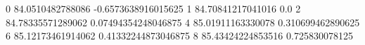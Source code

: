 0 84.0510482788086 -0.6573638916015625
1 84.70841217041016 0.0
2 84.78335571289062 0.07494354248046875
4 85.01911163330078 0.310699462890625
6 85.12173461914062 0.41332244873046875
8 85.43424224853516 0.725830078125

